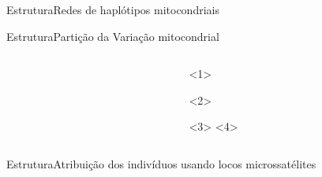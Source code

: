 \documentclass{beamer}
\begin{document}
  
\begin{frame}{Estrutura}{Redes de haplótipos  mitocondriais}
 \centering
      \\ 
\end{frame}




\begin{frame}{Estrutura}{Parti\c{c}ão da Varia\c{c}ão mitocondrial}

  
  \begin{columns}
    


      \begin{column}{7cm}
       \centering
      \\

    \end{column}
    \begin{column}{6cm}
      \centering
       <1>

        <2>

        <3>
        <4>
        
    \end{column}

  
  \end{columns}  

  
\end{frame} 



  
    
\begin{frame}{Estrutura}{Atribui\c{c}ão dos indivíduos usando locos microssatélites}

\end{frame}
\end{document}
